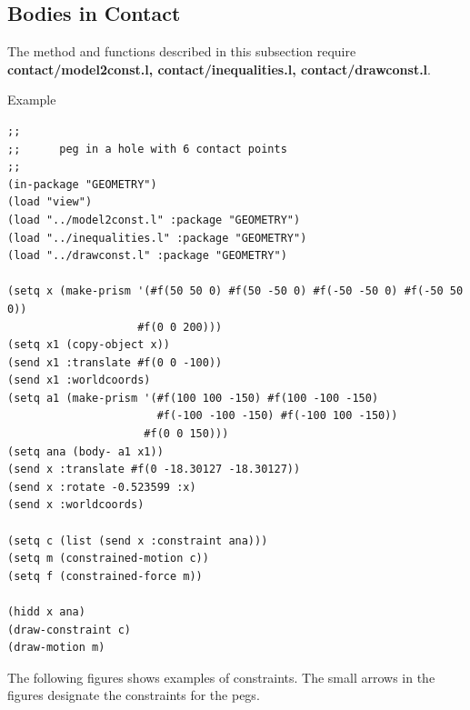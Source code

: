 \subsection{\label{Contact}Bodies in Contact}

The method and functions described in this subsection require
{\bf contact/model2const.l, con\-tact/in\-e\-qual\-i\-ties.l,
 contact/drawconst.l}.

\begin{refdesc}






\end{refdesc}
Example\\
\begin{verbatim}
;;
;;      peg in a hole with 6 contact points
;;
(in-package "GEOMETRY")
(load "view")
(load "../model2const.l" :package "GEOMETRY")
(load "../inequalities.l" :package "GEOMETRY")
(load "../drawconst.l" :package "GEOMETRY")

(setq x (make-prism '(#f(50 50 0) #f(50 -50 0) #f(-50 -50 0) #f(-50 50 0))
                    #f(0 0 200)))
(setq x1 (copy-object x))
(send x1 :translate #f(0 0 -100))
(send x1 :worldcoords)
(setq a1 (make-prism '(#f(100 100 -150) #f(100 -100 -150)
                       #f(-100 -100 -150) #f(-100 100 -150))
                     #f(0 0 150)))
(setq ana (body- a1 x1))
(send x :translate #f(0 -18.30127 -18.30127))
(send x :rotate -0.523599 :x)
(send x :worldcoords)

(setq c (list (send x :constraint ana)))
(setq m (constrained-motion c))
(setq f (constrained-force m))

(hidd x ana)
(draw-constraint c)
(draw-motion m)
\end{verbatim}
\clearpage
The following figures shows examples of constraints.
The small arrows in the figures designate the constraints for the pegs.
\\ 

